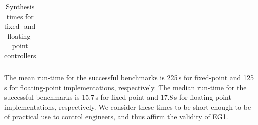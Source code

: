 \begin{table}
\begin{tabular}{| l | c | c | r | c | r |}
\hline
%
\end{tabular}
\vspace{0.05in}
\caption{Synthesis times for fixed- and floating-point controllers\label{tab:results}}
\end{table}

The mean run-time for the successful benchmarks is 225\,s for fixed-point and 125\,s for floating-point implementations, respectively.  
The median run-time for the successful benchmarks is 15.7\,s for fixed-point and 17.8\,s for floating-point implementations, respectively.
We consider these times to be short enough to be of practical use to control engineers, and thus affirm the validity of EG1.

